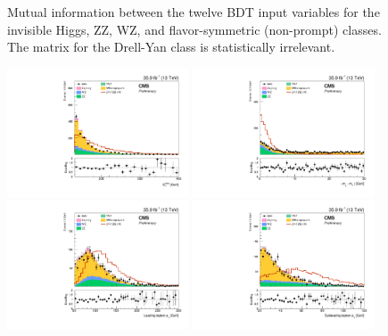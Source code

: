 \begin{figure}[htbp]
\begin{center}
\caption{Mutual information between the twelve BDT input variables for the invisible Higgs, ZZ, WZ, and flavor-symmetric (non-prompt) classes. The matrix for the Drell-Yan class is statistically irrelevant.}
\label{fig:bdt_mutual_information}
\end{center}
\end{figure}

\begin{figure}[htbp]
\begin{center}
\includegraphics[width=0.48\textwidth]{figures/mva_MET_nice.pdf}
\includegraphics[width=0.48\textwidth]{figures/mva_mll_minus_mZ_nice.pdf}
\includegraphics[width=0.48\textwidth]{figures/mva_ptl1_nice.pdf}
\includegraphics[width=0.48\textwidth]{figures/mva_ptl2_nice.pdf}

\end{center}
\end{figure}
